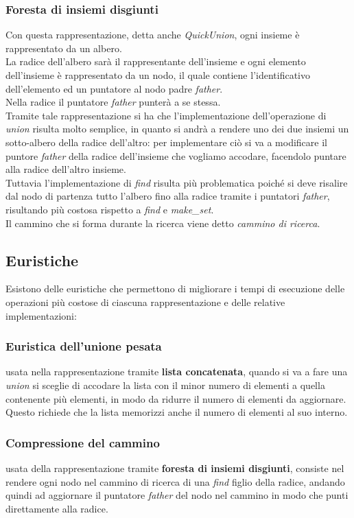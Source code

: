 \documentclass[12pt]{article}
\begin{document}
    \subsubsection{Foresta di insiemi disgiunti}  Con questa rappresentazione, detta anche \textit{QuickUnion}, ogni insieme è rappresentato da un albero.\\
    La radice dell'albero sarà il rappresentante dell'insieme e ogni elemento dell'insieme è rappresentato da un nodo, il quale contiene l'identificativo dell'elemento ed un puntatore al nodo padre \textit{father}.\\
    Nella radice il puntatore \textit{father} punterà a se stessa.\\
    Tramite tale rappresentazione si ha che l'implementazione dell'operazione di \textit{union} risulta molto semplice, in quanto si andrà a rendere uno dei due insiemi un sotto-albero della radice dell'altro: per implementare ciò si va a modificare il puntore \textit{father} della radice dell'insieme che vogliamo accodare, facendolo puntare alla radice dell'altro insieme.\\
    Tuttavia l'implementazione di \textit{find} risulta più problematica poiché si deve risalire dal nodo di partenza tutto l'albero fino alla radice tramite i puntatori \textit{father}, risultando più costosa rispetto a \textit{find} e \textit{make\_set}.\\
    Il cammino che si forma durante la ricerca viene detto \emph{cammino di ricerca}.

\subsection{Euristiche}
Esistono delle euristiche che permettono di migliorare i tempi di esecuzione delle operazioni più costose di ciascuna rappresentazione e delle relative implementazioni:

    \subsubsection{Euristica dell'unione pesata} usata nella rappresentazione tramite \textbf{lista concatenata}, quando si va a fare una \textit{union} si sceglie di accodare la lista con il minor numero di elementi a quella contenente più elementi, in modo da ridurre il numero di elementi da aggiornare.\\
    Questo richiede che la lista memorizzi anche il numero di elementi al suo interno.

    \subsubsection{Compressione del cammino} usata della rappresentazione tramite \textbf{foresta di insiemi disgiunti}, consiste nel rendere ogni nodo nel cammino di ricerca di una \textit{find} figlio della radice, andando quindi ad aggiornare il puntatore \textit{father} del nodo nel cammino in modo che punti direttamente alla radice.\\
\end{document}
